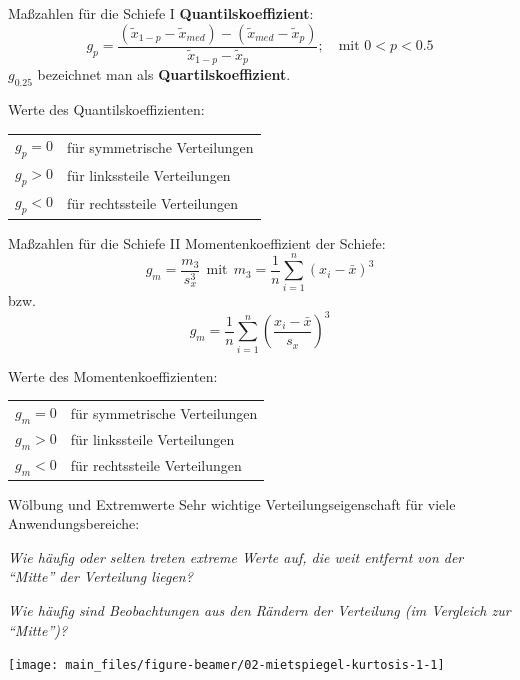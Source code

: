 \documentclass[
  10pt,
  ignorenonframetext,
]{beamer}
\begin{document}
\begin{frame}{Maßzahlen für die Schiefe I}
\label{mauxdfzahlen-fuxfcr-die-schiefe-i}
\textbf{Quantilskoeffizient}: \begin{equation*}
    g_p = \frac{(\tilde x_{1-p} - \tilde x_{med}) - (\tilde x_{med} - \tilde x_p)}{\tilde x_{1-p} - \tilde x_p}; \quad \text{mit } 0 < p < 0.5
\end{equation*} \(g_{0.25}\) bezeichnet man als
\textbf{Quartilskoeffizient}.

Werte des Quantilskoeffizienten:

\begin{tabular}{ll}
      $g_p = 0$ & für symmetrische Verteilungen \\
      $g_p > 0$ & für linkssteile Verteilungen \\
      $g_p < 0$ & für rechtssteile Verteilungen \\
\end{tabular}
\end{frame}

\begin{frame}{Maßzahlen für die Schiefe II}
\label{mauxdfzahlen-fuxfcr-die-schiefe-ii}
Momentenkoeffizient der Schiefe: \begin{equation*}
g_m = \frac{m_3}{s_x^3} \ \ \text{mit} \ \ m_3 =
\frac{1}{n} \sum_{i=1}^n (x_i - \bar x)^3 
\end{equation*} bzw. \begin{equation*}
g_m = \frac{1}{n} \sum_{i=1}^n \left(\frac{x_i - \bar x}{s_x}\right)^3 
\end{equation*}

Werte des Momentenkoeffizienten:

\begin{tabular}{ll}
  $g_m = 0$ & für symmetrische Verteilungen \\
  $g_m > 0$ & für linkssteile Verteilungen \\
  $g_m < 0$ & für rechtssteile Verteilungen
\end{tabular}
\end{frame}

\begin{frame}{Wölbung und Extremwerte}
\label{wuxf6lbung-und-extremwerte}
Sehr wichtige Verteilungseigenschaft für viele Anwendungsbereiche:

\emph{Wie häufig oder selten treten extreme Werte auf, die weit entfernt
von der ``Mitte'' der Verteilung liegen?}

\emph{Wie häufig sind Beobachtungen aus den Rändern der Verteilung (im
Vergleich zur ``Mitte'')?}

\scriptsize

\begin{center}\texttt{[image: main\_files/figure-beamer/02-mietspiegel-kurtosis-1-1]} \end{center}

\normalsize
\end{frame}
\end{document}
